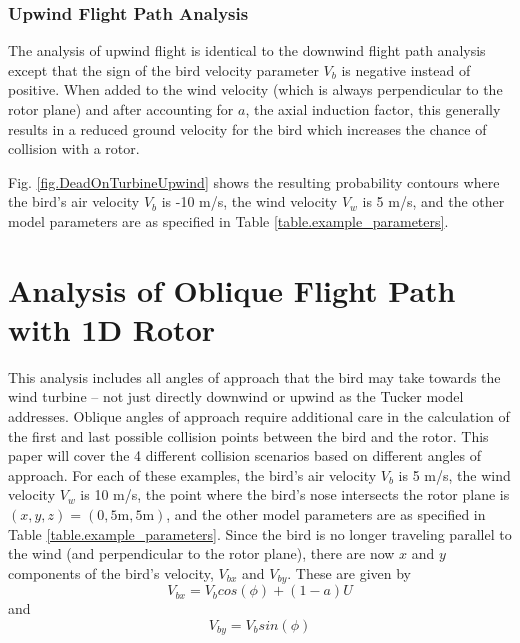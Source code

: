 \documentclass[10pt,conference]{IEEEtran}
\begin{document}
\subsubsection{Upwind Flight Path Analysis}
The analysis of upwind flight is identical to the downwind flight path analysis except that the sign of the bird
velocity parameter $V_b$ is negative instead of positive. When added to the wind velocity (which is always
perpendicular to the rotor plane) and after accounting for $a$, the axial induction factor, this generally results in a
reduced ground velocity for the bird which increases the chance of collision with a rotor.

Fig. \ref{fig.DeadOnTurbineUpwind} shows the resulting probability contours where the bird's air velocity $V_b$ is -10
m/s, the wind velocity $V_w$ is 5 m/s, and the other model parameters are as specified in Table
\ref{table.example_parameters}.

\section{Analysis of Oblique Flight Path with 1D Rotor}
This analysis includes all angles of approach that the bird may take towards the wind turbine -- not just directly
downwind or upwind as the Tucker model addresses. Oblique angles of approach require additional care in the calculation
of the first and last possible collision points between the bird and the rotor. This paper will cover the 4 different
collision scenarios based on different angles of approach. For each of these examples, the bird's air velocity $V_b$ is
5 m/s, the wind velocity $V_w$ is 10 m/s, the point where the bird's nose intersects the rotor plane is $(x,y,z) =
(0,5\text{m},5\text{m})$, and the other model parameters are as specified in Table \ref{table.example_parameters}.
Since the bird is no longer traveling parallel to the wind (and perpendicular to the rotor plane), there are now $x$
and $y$ components of the bird's velocity, $V_{bx}$ and $V_{by}$. These are given by
\begin{equation*}
    V_{bx} = V_b cos(\phi)+(1-a)U
\end{equation*}
and
\begin{equation*}
    V_{by} = V_b sin(\phi)
\end{equation*}
\end{document}
